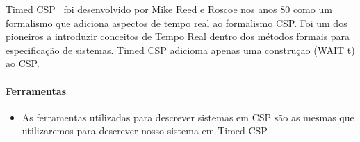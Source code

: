 Timed CSP~\cite{Schneider:1999:CRT:555233} foi desenvolvido por Mike Reed  e Roscoe nos anos 80 como um formalismo que adiciona
aspectos de tempo real ao formalismo CSP. Foi um dos pioneiros a introduzir conceitos de Tempo Real
dentro dos métodos formais para especificação de sistemas. Timed CSP adicioma apenas uma construçao (WAIT t) ao CSP.

\paragraph{Ferramentas}
\begin{itemize}
\item {As ferramentas utilizadas para descrever sistemas em CSP são as mesmas que utilizaremos para descrever nosso sistema em Timed CSP}
\end{itemize}

